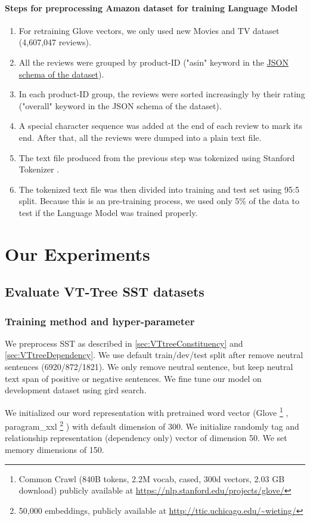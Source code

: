 \paragraph{Steps for preprocessing Amazon dataset for training Language Model}
\label{sec:preprocessamazonglove-LM}
\begin{enumerate}
\item For retraining Glove vectors, we only used new Movies and TV dataset (4,607,047 reviews)\cite{McAuleyTSH15}\cite{HeM16}.
\item All the reviews were grouped by product-ID ("asin" keyword in the \hyperref[sec:amazon]{JSON schema of the dataset}). 
\item In each product-ID group, the reviews were sorted increasingly by their rating ("overall" keyword in the JSON schema of the dataset).
\item A special character sequence was added at the end of each review to mark its end.
After that, all the reviews were dumped into a plain text file.
\item The text file produced from the previous step was tokenized using Stanford Tokenizer \cite{tokenizerpart}. 
\item The tokenized text file was then divided into training and test set using 95:5 split.
Because this is an pre-training process, we used only 5\% of the data to test if the Language Model was trained properly.
\end{enumerate}


\section{Our Experiments}
\subsection{Evaluate VT-Tree SST datasets}
\subsubsection{Training method and hyper-parameter}
We preprocess SST as described in \ref{sec:VTtreeConstituency} and \ref{sec:VTtreeDependency}. We use default train/dev/test split after remove neutral sentences (6920/872/1821). We only remove neutral sentence, but keep neutral text span of positive or negative sentences. We fine tune our model on development dataset using gird search.

We initialized our word representation with pretrained word vector (Glove \footnote{Common Crawl (840B tokens, 2.2M vocab, cased, 300d vectors, 2.03 GB download) publicly available at \url{https://nlp.stanford.edu/projects/glove/}} \cite{glove}, paragram\_xxl \footnote{50,000 embeddings, publicly available at \url{http://ttic.uchicago.edu/~wieting/}} \cite{wieting2015towards}) with default dimension of 300.  We initialize randomly tag and relationship representation (dependency only) vector of dimension 50. We set memory dimensions of 150. 


